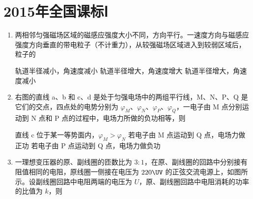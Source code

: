\documentclass[\gkver]{gaokaozhenti}
\begin{document}
\chapter{2015年全国课标Ⅰ}

\begin{enumerate}
\item
两相邻匀强磁场区域的磁感应强度大小不同，方向平行。一速度方向与磁感应强度方向垂直的带电粒子（不计重力），从较强磁场区域进入到较弱区域后，粒子的

{轨道半径减小，角速度减小}
{轨道半径增大，角速度增大}
{轨道半径增大，角速度减小}


\item
右图的直线 a、b 和 c、d 是处于匀强电场中的两组平行线，M、N、P、Q 是它们的交点，四点处的电势分别为 $\varphi_{M}$、$\varphi_{N}$、$\varphi_{P}$、$\varphi_{Q}$，一电子由 M 点分别运动到 N 点和 P 点的过程中，电场力所做的负功相等，则

\onepicture[w=2.44cm]{}

{直线 c 位于某一等势面内，$\varphi_{M}>\varphi_{N}$}
{若电子由 M 点运动到 Q 点，电场力做正功}
{若电子由 P 点运动到 Q 点，电场力做负功}


\item
一理想变压器的原、副线圈的匝数比为 $3:1$，在原、副线圈的回路中分别接有阻值相同的电阻，原线圈一侧接在电压为 $220\UV$ 的正弦交流电源上，如图所示。设副线圈回路中电阻两端的电压为 $U$，原、副线圈回路中电阻消耗的功率的比值为 $k$，则

\onepicture[w=4.18cm]{}


\end{enumerate}
\end{document}
